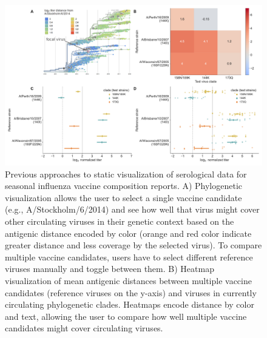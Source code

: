 \documentclass[utf8]{FrontiersinHarvard} %
\begin{document}

\begin{figure}[h!]
  \begin{center}
    \includegraphics[width=\textwidth]{figures/figure-1-static-titer-visualizations}
  \end{center}
  \caption{
    Previous approaches to static visualization of serological data for seasonal influenza vaccine composition reports.
A) Phylogenetic visualization \citep{NeherBedford2018} allows the user to select a single vaccine candidate (e.g., A/Stockholm/6/2014) and see how well that virus might cover other circulating viruses in their genetic context based on the antigenic distance encoded by color (orange and red color indicate greater distance and less coverage by the selected virus).
To compare multiple vaccine candidates, users have to select different reference viruses manually and toggle between them.
B) Heatmap visualization of mean antigenic distances between multiple vaccine candidates (reference viruses on the y-axis) and viruses in currently circulating phylogenetic clades.
Heatmaps encode distance by color and text, allowing the user to compare how well multiple vaccine candidates might cover circulating viruses.
}
\end{figure}
\end{document}
